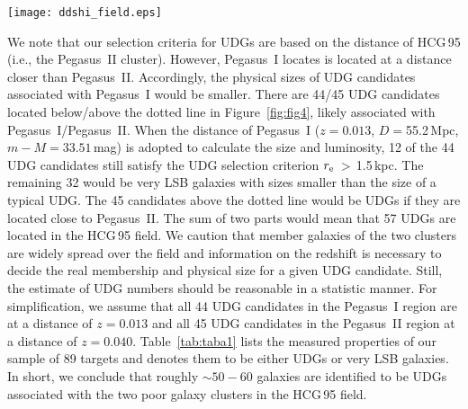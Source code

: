 \documentclass[twocolumn,trackchanges]{aastex61}
\begin{document}
\begin{figure*}
 \setlength{\abovecaptionskip}{5pt}
 \begin{center}
  \texttt{[image: ddshi\_field.eps]}

  \caption{Spatial distribution of our 89 candidates of UDGs (red circles). The group HCG\,95 is marked by the plus at the center. Squares represent nearby galaxies with $0.009<z<0.016$. Triangles show nearby galaxies with $0.034<z<0.045$. These nearby galaxies are associated with the poor galaxy clusters Pegasus~I (squares) at $z=0.013$ and Pegasus~II (triangles) at $z=0.040$. Of these, 29 are included in the NGC catalog and are shown with cyan symbols. The dotted line is a crude guide to separate the two galaxy clusters.}
  \label{fig:fig4}
 \end{center}
\end{figure*}



We note that our selection criteria for UDGs are based on the distance of HCG\,95 (i.e., the Pegasus~II cluster). However, Pegasus~I locates is located at a distance closer than Pegasus~II. Accordingly, the physical sizes of UDG candidates associated with Pegasus~I would be smaller. There are 44/45 UDG candidates located below/above the dotted line in Figure~\ref{fig:fig4},  likely associated with  Pegasus~I/Pegasus~II.  When the distance of Pegasus~I ($z=0.013$, $D=$55.2\,Mpc, $m-M=33.51$\,mag) is adopted to calculate the size and luminosity, 12 of the 44 UDG candidates still satisfy the UDG selection criterion $r_{\rm e}$\,$>$\,1.5\,kpc. The remaining 32 would be very LSB galaxies with sizes smaller than the size of a typical UDG. The 45 candidates above the dotted line would be UDGs if they are located close to Pegasus~II.  The sum of two parts  would mean that 57 UDGs are located in the HCG\,95 field.  We caution that member galaxies of the two clusters are widely spread over the field and information on the redshift is necessary to decide the real membership and physical size for a given UDG candidate. Still, the estimate of UDG numbers should be reasonable  in a statistic manner. For simplification, we assume that all 44 UDG candidates in the Pegasus~I region are at a distance of $z=0.013$ and all 45 UDG candidates in the Pegasus~II region at a distance of $z=0.040$.  Table~\ref{tab:taba1} lists the measured properties of our sample of 89 targets and denotes them to be either UDGs or very LSB galaxies.  In short, we conclude that roughly $\sim 50-60$ galaxies  are identified to be UDGs  associated with the two poor galaxy clusters in the HCG\,95 field. 
\end{document}
